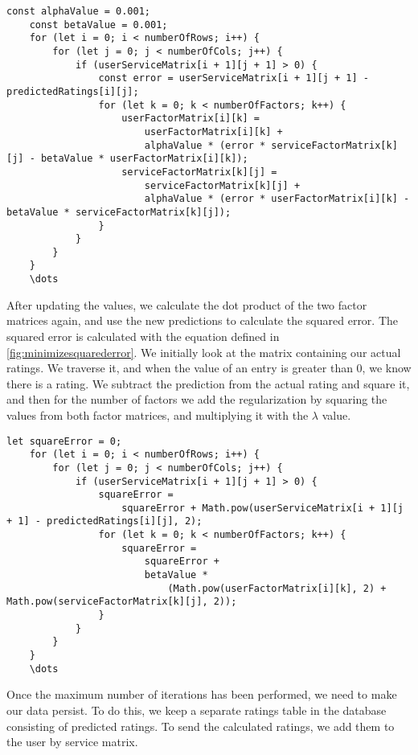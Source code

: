 \begin{lstlisting}[caption={}, captionpos=b, label={}]
    const alphaValue = 0.001;
    const betaValue = 0.001;
    for (let i = 0; i < numberOfRows; i++) {
        for (let j = 0; j < numberOfCols; j++) {
            if (userServiceMatrix[i + 1][j + 1] > 0) {
                const error = userServiceMatrix[i + 1][j + 1] - predictedRatings[i][j];
                for (let k = 0; k < numberOfFactors; k++) {
                    userFactorMatrix[i][k] =
                        userFactorMatrix[i][k] +
                        alphaValue * (error * serviceFactorMatrix[k][j] - betaValue * userFactorMatrix[i][k]);
                    serviceFactorMatrix[k][j] =
                        serviceFactorMatrix[k][j] +
                        alphaValue * (error * userFactorMatrix[i][k] - betaValue * serviceFactorMatrix[k][j]);
                }
            }
        }
    }
    \dots
\end{lstlisting}
After updating the values, we calculate the dot product of the two factor matrices again, and use the new predictions to calculate the squared error.
The squared error is calculated with the equation defined in \autoref{fig:minimizesquarederror}.
We initially look at the matrix containing our actual ratings.
We traverse it, and when the value of an entry is greater than 0, we know there is a rating.
We subtract the prediction from the actual rating and square it, and then for the number of factors we add the regularization by squaring the values from both factor matrices, and multiplying it with the $\lambda$ value.
\begin{lstlisting}[caption={}, captionpos=b, label={}]
    let squareError = 0;
    for (let i = 0; i < numberOfRows; i++) {
        for (let j = 0; j < numberOfCols; j++) {
            if (userServiceMatrix[i + 1][j + 1] > 0) {
                squareError =
                    squareError + Math.pow(userServiceMatrix[i + 1][j + 1] - predictedRatings[i][j], 2);
                for (let k = 0; k < numberOfFactors; k++) {
                    squareError =
                        squareError +
                        betaValue *
                            (Math.pow(userFactorMatrix[i][k], 2) + Math.pow(serviceFactorMatrix[k][j], 2));
                }
            }
        }
    }
    \dots
\end{lstlisting}
Once the maximum number of iterations has been performed, we need to make our data persist.
To do this, we keep a separate ratings table in the database consisting of predicted ratings.
To send the calculated ratings, we add them to the user by service matrix.
